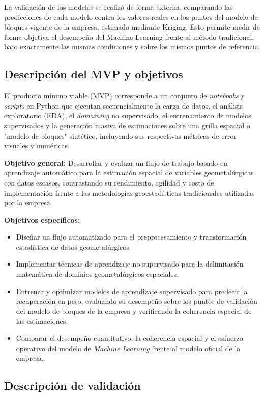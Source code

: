 \documentclass[12pt,letterpaper]{article}
\begin{document}
	La validación de los modelos se realizó de forma externa, comparando las 
	predicciones de cada modelo contra los valores reales en los puntos del modelo 
	de bloques vigente de la empresa, estimado mediante Kriging. Esto permite medir 
	de forma objetiva el desempeño del Machine Learning frente al método tradicional, 
	bajo exactamente las mismas condiciones y sobre los mismos puntos de referencia.
	
	\subsection{Descripción del MVP y objetivos}
	
	El producto mínimo viable (MVP) corresponde a un conjunto de \textit{notebooks} y \textit{scripts} en Python que ejecutan secuencialmente la carga de datos, el análisis exploratorio (EDA), el \textit{domaining} no supervisado, el entrenamiento de modelos supervisados y la generación masiva de estimaciones sobre una grilla espacial o "modelo de bloques" sintético, incluyendo sus respectivas métricas de error visuales y numéricas.
	
	\textbf{Objetivo general:}
	Desarrollar y evaluar un flujo de trabajo basado en aprendizaje automático para la estimación espacial de variables geometalúrgicas con datos escasos, contrastando su rendimiento, agilidad y costo de implementación frente a las metodologías geoestadísticas tradicionales utilizadas por la empresa.
	
	\textbf{Objetivos específicos:}
	\begin{itemize}
		\item Diseñar un flujo automatizado para el preprocesamiento y transformación estadística de datos geometalúrgicos.
		\item Implementar técnicas de aprendizaje no supervisado para la delimitación matemática de dominios geometalúrgicos espaciales.
		\item Entrenar y optimizar modelos de aprendizaje supervisado para predecir la 
		recuperación en peso, evaluando su desempeño sobre los puntos de validación 
		del modelo de bloques de la empresa y verificando la coherencia espacial de 
		las estimaciones.
		\item Comparar el desempeño cuantitativo, la coherencia espacial y el esfuerzo operativo del modelo de \textit{Machine Learning} frente al modelo oficial de la empresa.
	\end{itemize}
	
	\subsection{Descripción de validación}
	
\end{document}
